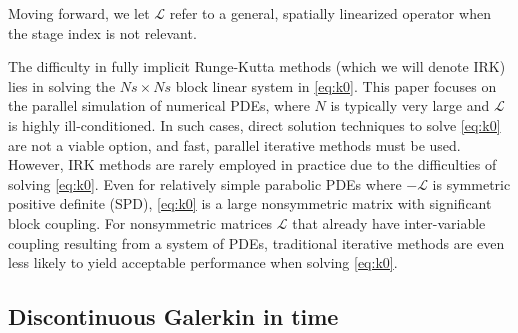 \documentclass[review]{siamart}
\begin{document}
Moving forward, we let $\mathcal{L}$ refer to a general, spatially linearized
operator when the stage index is not relevant.

The difficulty in fully implicit Runge-Kutta methods (which we will denote IRK)
lies in solving the $Ns\times Ns$ block linear system in \eqref{eq:k0}. This
paper focuses on the parallel simulation of numerical PDEs, where $N$ is
typically very large and $\mathcal{L}$ is highly ill-conditioned. In such cases,
direct solution techniques to solve \eqref{eq:k0} are not a viable option, and
fast, parallel iterative methods must be used. However, IRK methods are rarely
employed in practice due to the difficulties of solving \eqref{eq:k0}. Even for
relatively simple parabolic PDEs where $-\mathcal{L}$ is symmetric positive
definite (SPD), \eqref{eq:k0} is a large nonsymmetric matrix with significant
block coupling. For nonsymmetric matrices $\mathcal{L}$ that already have
inter-variable coupling resulting from a system of PDEs, traditional iterative
methods are even less likely to yield acceptable performance when solving
\eqref{eq:k0}.

\subsection{Discontinuous Galerkin in time}\label{sec:intro:dg}
\end{document}
